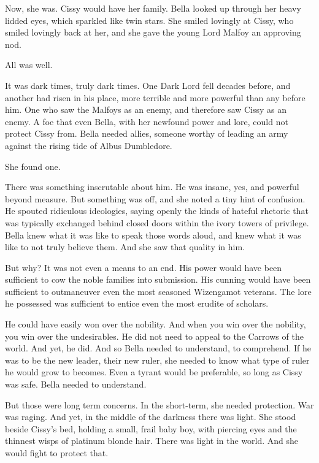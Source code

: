 Now, she was. Cissy would have her family. Bella looked up through her heavy lidded eyes, which sparkled like twin stars. She smiled lovingly at Cissy, who smiled lovingly back at her, and she gave the young Lord Malfoy an approving nod.

All was well.
\simpleline


It was dark times, truly dark times. One Dark Lord fell decades before, and another had risen in his place, more terrible and more powerful than any before him. One who saw the Malfoys as an enemy, and therefore saw Cissy as an enemy. A foe that even Bella, with her newfound power and lore, could not protect Cissy from. Bella needed allies, someone worthy of leading an army against the rising tide of Albus Dumbledore.

She found one.

There was something inscrutable about him. He was insane, yes, and powerful beyond measure. But something was off, and she noted a tiny hint of confusion. He spouted ridiculous ideologies, saying openly the kinds of hateful rhetoric that was typically exchanged behind closed doors within the ivory towers of privilege. Bella knew what it was like to speak those words aloud, and knew what it was like to not truly believe them. And she saw that quality in him.

But why? It was not even a means to an end. His power would have been sufficient to cow the noble families into submission. His cunning would have been sufficient to outmaneuver even the most seasoned Wizengamot veterans. The lore he possessed was sufficient to entice even the most erudite of scholars.

He could have easily won over the nobility. And when you win over the nobility, you win over the undesirables. He did not need to appeal to the Carrows of the world. And yet, he did. And so Bella needed to understand, to comprehend. If he was to be the new leader, their new ruler, she needed to know what type of ruler he would grow to becomes. Even a tyrant would be preferable, so long as Cissy was safe. Bella needed to understand.

But those were long term concerns. In the short-term, she needed protection. War was raging. And yet, in the middle of the darkness there was light. She stood beside Cissy’s bed, holding a small, frail baby boy, with piercing eyes and the thinnest wisps of platinum blonde hair. There was light in the world. And she would fight to protect that.
\simpleline

